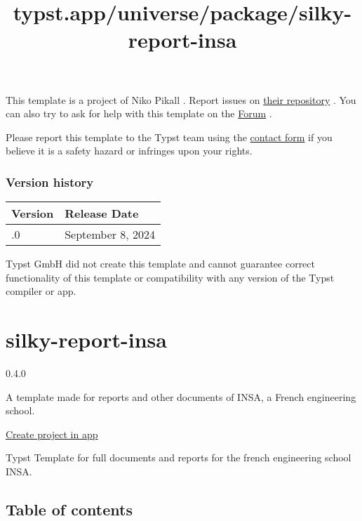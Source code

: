 This template is a project of Niko Pikall . Report issues on
\href{https://github.com/npikall/rubber-article.git}{their repository} .
You can also try to ask for help with this template on the
\href{https://forum.typst.app}{Forum} .

Please report this template to the Typst team using the
\href{https://typst.app/contact}{contact form} if you believe it is a
safety hazard or infringes upon your rights.

\label{versions}
\subsubsection{Version history}\label{version-history}

\begin{longtable}[]{@{}ll@{}}
\toprule\noalign{}
Version & Release Date \\
\midrule\noalign{}
\endhead
\bottomrule\noalign{}
\endlastfoot
0.1.0 & September 8, 2024 \\
\end{longtable}

Typst GmbH did not create this template and cannot guarantee correct
functionality of this template or compatibility with any version of the
Typst compiler or app.


\title{typst.app/universe/package/silky-report-insa}

\label{banner}
\label{template-thumbnail}

\section{silky-report-insa}\label{silky-report-insa}

{ 0.4.0 }

A template made for reports and other documents of INSA, a French
engineering school.

\href{/app?template=silky-report-insa&version=0.4.0}{Create project in
app}

\label{readme}
Typst Template for full documents and reports for the french engineering
school INSA.

\subsection{Table of contents}\label{table-of-contents}

